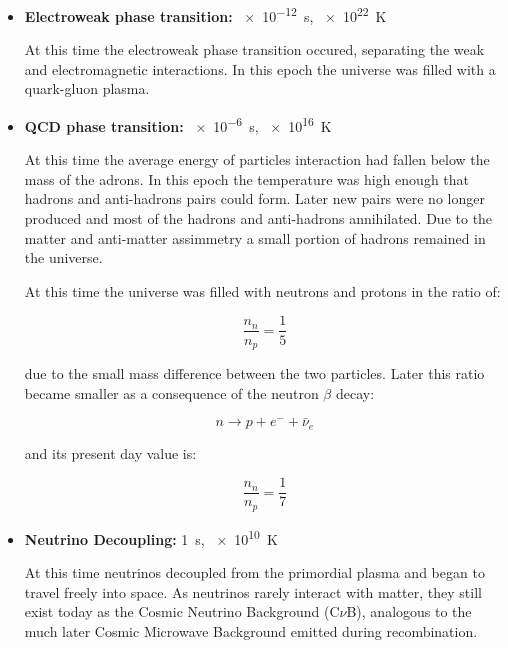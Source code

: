 \begin{itemize}
        \item \textbf{Electroweak phase transition:} \SI{e-12}{\second},
        \SI{e22}{\kelvin}

        At this time the electroweak phase transition occured, separating
        the weak and electromagnetic interactions. In this epoch the
        universe was filled with a quark-gluon plasma.
        \item \textbf{QCD phase transition:} \SI{e-6}{\second},
        \SI{e16}{\kelvin}

        At this time the average energy of particles interaction had fallen
        below the mass of the adrons. In this epoch the temperature was
        high enough that hadrons and anti-hadrons pairs could form. Later
        new pairs were no longer produced and most of the hadrons and
        anti-hadrons annihilated. Due to the matter and anti-matter
        assimmetry a small portion of hadrons remained in the universe.

        At this time the universe was filled with neutrons and protons in
        the ratio of:

        \begin{equation}
                \frac{n_n}{n_p} = \frac{1}{5}
        \end{equation}

        due to the small mass difference between the two particles. Later
        this ratio became smaller as a consequence of the neutron $\beta$
        decay:

        \begin{equation}
                n \rightarrow p + e^- + \bar\nu_e
        \end{equation}

        and its present day value is:

        \begin{equation}
                \frac{n_n}{n_p} = \frac{1}{7}
        \end{equation}

        \item \textbf{Neutrino Decoupling:} \SI{1}{\second},
        \SI{e10}{\kelvin}

        At this time neutrinos decoupled from the primordial plasma and
        began to travel freely into space. As neutrinos rarely interact
        with matter, they still exist today as the Cosmic
        Neutrino Background (C$\nu$B), analogous to the much later Cosmic
        Microwave Background emitted during recombination.


\end{itemize}
